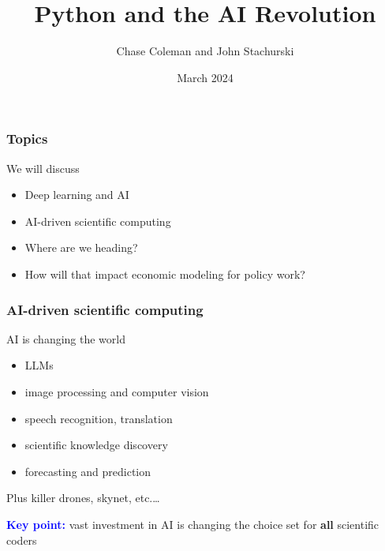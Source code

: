 \documentclass[
    xcolor={svgnames,dvipsnames},
    hyperref={colorlinks, citecolor=DeepPink4, linkcolor=DarkRed, urlcolor=DarkBlue}
    ]{beamer}  %
\title{Python and the AI Revolution}
\author{Chase Coleman and John Stachurski}
\date{March 2024}
\newcommand{\navy}[1]{\textcolor{Blue}{\bf #1}}
\newcommand{\emp}[1]{\textcolor{DarkOrange1}{\bf #1}}
\newcommand{\1}{\mathbbm 1}
\begin{document}
\begin{frame}
  \titlepage
\end{frame}







\begin{frame}
    \frametitle{Topics}

    We will discuss

    \begin{itemize}
        \item Deep learning and AI
        \vspace{0.5em}
        \item AI-driven scientific computing
        \vspace{0.5em}
        \item Where are we heading?
        \vspace{0.5em}
        \item How will that impact economic modeling for policy work?
    \end{itemize}


\end{frame}



\begin{frame}
    \frametitle{AI-driven scientific computing}

    AI is changing the world

    \begin{itemize}
        \item LLMs
        \item image processing and computer vision
        \item speech recognition, translation
        \item scientific knowledge discovery
        \item forecasting and prediction 
    \end{itemize}

    \pause

        \vspace{0.5em}
        \vspace{0.5em}
    Plus killer drones, skynet, etc.\ldots

    \pause
        \vspace{0.5em}
        \vspace{0.5em}
        \navy{Key point:} vast investment in AI is changing the choice set
    for \emp{all} scientific coders
    
\end{frame}
\end{document}
